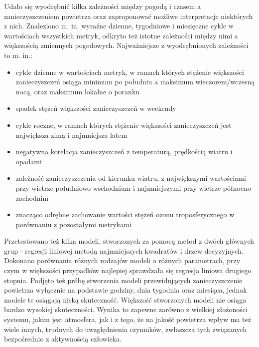 \documentclass[18pt, letterpaper]{article}
\begin{document}
Udało się wyodrębnić kilka zależności między pogodą i czasem a zanieczyszczeniem powietrza oraz zaproponować możliwe interpretacje niektórych z nich. Znaleziono m. in. wyraźne dzienne, tygodniowe i miesięczne cykle w wartościach wszystkich metryk, odkryto też istotne zależności między nimi a większością zmiennych pogodowych. Najważniejsze z wyodrębnionych zależności to m. in.:
\begin{itemize}
    \item cykle dzienne w wartościach metryk, w ramach których stężenie większości zanieczyszczeń osiąga minimum po południu a maksimum wieczorem/wczesną nocą, oraz maksimum lokalne o poranku
    \item spadek stężeń większości zanieczyszczeń w weekendy
    \item cykle roczne, w ramach których stężenie większości zanieczyszczeń jest największa zimą i najmniejsza latem
    \item negatywna korelacja zanieczyszczeń z temperaturą, prędkością wiatru i opadami
    \item zależność zanieczyszczenia od kierunku wiatru, z największymi wartościami przy wietrze południowo-wschodnium i najmniejszymi przy wietrze północno-zachodnim
    \item znacząco odrębne zachowanie wartości stężeń ozonu troposferycznego w porównaniu z pozostałymi metrykami
\end{itemize}

Przetestowano też kilka modeli, stworzonych za pomocą metod z dwóch głównych grup - regresji liniowej metodą najmniejszych kwadratów i drzew decyzyjnych. Dokonano porównania różnych rodzajów modeli o różnych parametrach, przy czym w większości przypadków najlepiej sprawdzała się regresja liniowa drugiego stopnia. Podjęto też próbę stworzenia modeli przewidujących zanieczyszczenie powietrza wyłącznie na podstawie godziny, dnia tygodnia oraz miesiąca, jednak modele te osiągają niską skuteczność. Większość stworzonych modeli nie osiąga bardzo wysokiej skuteczności. Wynika to zapewne zarówno z wielkiej złożoności systemu, jakim jest atmosfera, jak i z tego, że na jakość powietrza wpływ ma też wiele innych, trudnych do uwzględnienia czynników, zwłaszcza tych związanych bezpośrednio z aktywnością człowieka.



\end{document}
